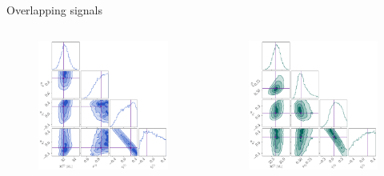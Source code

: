 \documentclass[usenames,dvipsnames,t]{beamer}
\begin{document}
\begin{frame}{Overlapping signals}
  \begin{columns}
    \begin{column}{0.49\textwidth}
      \begin{figure}
        \centering
        \includegraphics[width=0.85\linewidth]{Figures/OS_injection_139_v2_1_cornerplot_M_c_q_s1_z_s2_z.pdf}
      \end{figure}
    \end{column}

    \begin{column}{0.49\textwidth}
      \begin{figure}
        \centering
        \includegraphics[width=0.85\linewidth]{Figures/OS_injection_139_v2_2_cornerplot_M_c_q_s1_z_s2_z.pdf}
      \end{figure}
    \end{column}
  \end{columns}
\end{frame}
\end{document}
